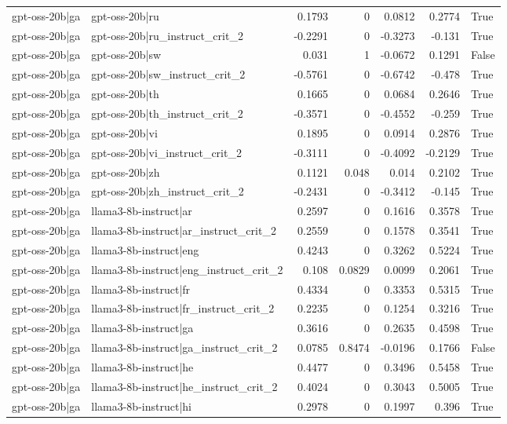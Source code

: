 \begin{table}
\begin{tabular}{l l r r r r l}
gpt-oss-20b|ga & gpt-oss-20b|ru & 0.1793 & 0 & 0.0812 & 0.2774 & True \\
gpt-oss-20b|ga & gpt-oss-20b|ru_instruct_crit_2 & -0.2291 & 0 & -0.3273 & -0.131 & True \\
gpt-oss-20b|ga & gpt-oss-20b|sw & 0.031 & 1 & -0.0672 & 0.1291 & False \\
gpt-oss-20b|ga & gpt-oss-20b|sw_instruct_crit_2 & -0.5761 & 0 & -0.6742 & -0.478 & True \\
gpt-oss-20b|ga & gpt-oss-20b|th & 0.1665 & 0 & 0.0684 & 0.2646 & True \\
gpt-oss-20b|ga & gpt-oss-20b|th_instruct_crit_2 & -0.3571 & 0 & -0.4552 & -0.259 & True \\
gpt-oss-20b|ga & gpt-oss-20b|vi & 0.1895 & 0 & 0.0914 & 0.2876 & True \\
gpt-oss-20b|ga & gpt-oss-20b|vi_instruct_crit_2 & -0.3111 & 0 & -0.4092 & -0.2129 & True \\
gpt-oss-20b|ga & gpt-oss-20b|zh & 0.1121 & 0.048 & 0.014 & 0.2102 & True \\
gpt-oss-20b|ga & gpt-oss-20b|zh_instruct_crit_2 & -0.2431 & 0 & -0.3412 & -0.145 & True \\
gpt-oss-20b|ga & llama3-8b-instruct|ar & 0.2597 & 0 & 0.1616 & 0.3578 & True \\
gpt-oss-20b|ga & llama3-8b-instruct|ar_instruct_crit_2 & 0.2559 & 0 & 0.1578 & 0.3541 & True \\
gpt-oss-20b|ga & llama3-8b-instruct|eng & 0.4243 & 0 & 0.3262 & 0.5224 & True \\
gpt-oss-20b|ga & llama3-8b-instruct|eng_instruct_crit_2 & 0.108 & 0.0829 & 0.0099 & 0.2061 & True \\
gpt-oss-20b|ga & llama3-8b-instruct|fr & 0.4334 & 0 & 0.3353 & 0.5315 & True \\
gpt-oss-20b|ga & llama3-8b-instruct|fr_instruct_crit_2 & 0.2235 & 0 & 0.1254 & 0.3216 & True \\
gpt-oss-20b|ga & llama3-8b-instruct|ga & 0.3616 & 0 & 0.2635 & 0.4598 & True \\
gpt-oss-20b|ga & llama3-8b-instruct|ga_instruct_crit_2 & 0.0785 & 0.8474 & -0.0196 & 0.1766 & False \\
gpt-oss-20b|ga & llama3-8b-instruct|he & 0.4477 & 0 & 0.3496 & 0.5458 & True \\
gpt-oss-20b|ga & llama3-8b-instruct|he_instruct_crit_2 & 0.4024 & 0 & 0.3043 & 0.5005 & True \\
gpt-oss-20b|ga & llama3-8b-instruct|hi & 0.2978 & 0 & 0.1997 & 0.396 & True \\

\end{tabular}
\end{table}
